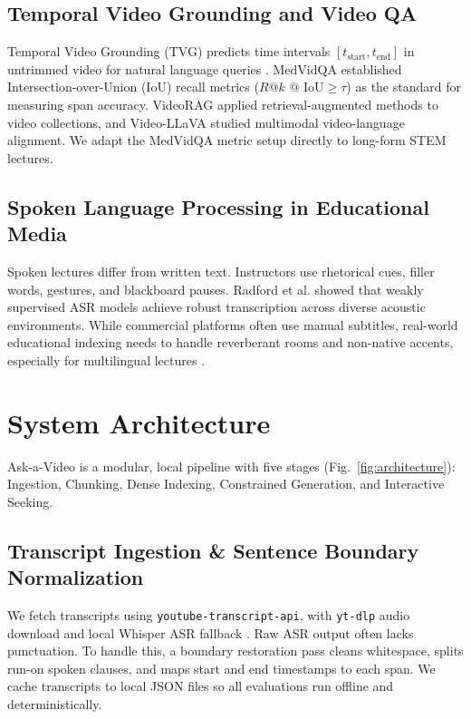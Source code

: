 \documentclass[conference]{IEEEtran}
\begin{document}
\subsection{Temporal Video Grounding and Video QA}
Temporal Video Grounding (TVG) predicts time intervals $[t_{\text{start}}, t_{\text{end}}]$ in untrimmed video for natural language queries \cite{krishna2017dense}. MedVidQA \cite{gupta2022medvidqa} established Intersection-over-Union (IoU) recall metrics ($R@k \text{ @ IoU} \ge \tau$) as the standard for measuring span accuracy. VideoRAG \cite{jeong2025videorag} applied retrieval-augmented methods to video collections, and Video-LLaVA \cite{lin2023videollava} studied multimodal video-language alignment. We adapt the MedVidQA metric setup directly to long-form STEM lectures.

\subsection{Spoken Language Processing in Educational Media}
Spoken lectures differ from written text. Instructors use rhetorical cues, filler words, gestures, and blackboard pauses. Radford et al. \cite{radford2023whisper} showed that weakly supervised ASR models achieve robust transcription across diverse acoustic environments. While commercial platforms often use manual subtitles, real-world educational indexing needs to handle reverberant rooms and non-native accents, especially for multilingual lectures \cite{bhattacharya2021nptel}.

\section{System Architecture}
\label{sec:architecture}
Ask-a-Video is a modular, local pipeline with five stages (Fig.~\ref{fig:architecture}): Ingestion, Chunking, Dense Indexing, Constrained Generation, and Interactive Seeking.

\subsection{Transcript Ingestion \& Sentence Boundary Normalization}
We fetch transcripts using \texttt{youtube-transcript-api}, with \texttt{yt-dlp} audio download and local Whisper ASR fallback \cite{radford2023whisper}. Raw ASR output often lacks punctuation. To handle this, a boundary restoration pass cleans whitespace, splits run-on spoken clauses, and maps start and end timestamps to each span. We cache transcripts to local JSON files so all evaluations run offline and deterministically.
\end{document}
